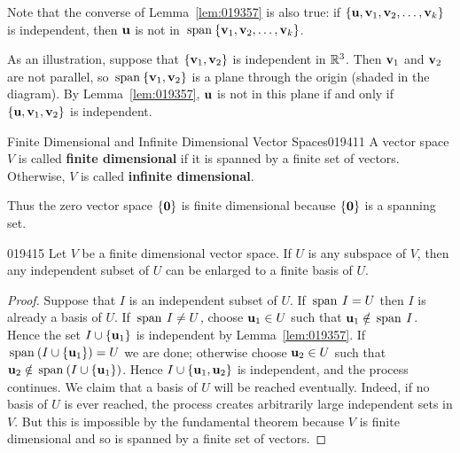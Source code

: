 \noindent Note that the converse of Lemma~\ref{lem:019357} is also true: if $\{\textbf{u}, \textbf{v}_{1}, \textbf{v}_{2}, \dots, \textbf{v}_{k}\}$ is independent, then $\textbf{u}$ is not in $\thinspace\operatorname{span\medspace}\{\textbf{v}_{1}, \textbf{v}_{2}, \dots, \textbf{v}_{k}\}$.

As an illustration, suppose that $\{\textbf{v}_{1}, \textbf{v}_{2}\}$ is independent in $\mathbb{R}^3$. Then $\textbf{v}_{1}$ and $\textbf{v}_{2}$ are not parallel, so $\thinspace\operatorname{span\medspace}\{\textbf{v}_{1}, \textbf{v}_{2}\}$ is a plane through the origin (shaded in the diagram). By Lemma~\ref{lem:019357}, $\textbf{u}$ is not in this plane if and only if $\{\textbf{u}, \textbf{v}_{1}, \textbf{v}_{2}\}$ is independent.

\begin{definition}{Finite Dimensional and Infinite Dimensional Vector Spaces}{019411}
A vector space $V$ is called \textbf{finite dimensional} if it is spanned by a finite set of vectors. Otherwise, $V$ is called \textbf{infinite  dimensional}.
\end{definition}

Thus the zero vector space $\{\textbf{0}\}$ is finite dimensional because $\{\textbf{0}\}$ is a spanning set.

\begin{lemma}{}{019415}
Let $V$ be a finite dimensional vector space. If $U$ is any subspace of $V$, then any independent subset of $U$ can be enlarged to a finite basis of $U$.
\end{lemma}

\begin{proof}
Suppose that $I$ is an independent subset of $U$. If $\thinspace\operatorname{span\medspace} I = U$ then $I$ is already a basis of $U$. If $\thinspace\operatorname{span\medspace} I \neq U$, choose $\textbf{u}_{1} \in U$ such that $\textbf{u}_{1} \notin \thinspace\operatorname{span\medspace} I$. Hence the set $I \cup \{\textbf{u}_{1}\}$ is independent by Lemma~\ref{lem:019357}. If $\thinspace\operatorname{span\medspace}(I \cup \{\textbf{u}_{1}\}) = U$ we are done; otherwise choose $\textbf{u}_{2} \in U$ such that $\textbf{u}_{2} \notin \thinspace\operatorname{span\medspace}(I \cup \{\textbf{u}_{1}\})$. Hence $I \cup \{\textbf{u}_{1}, \textbf{u}_{2}\}$ is independent, and the process continues. We claim that a basis of $U$ will be reached eventually. Indeed, if no basis of $U$ is ever reached, the process creates arbitrarily large independent sets in $V$. But this is impossible by the fundamental theorem because $V$ is finite dimensional and so is spanned by a finite set of vectors.
\end{proof}


